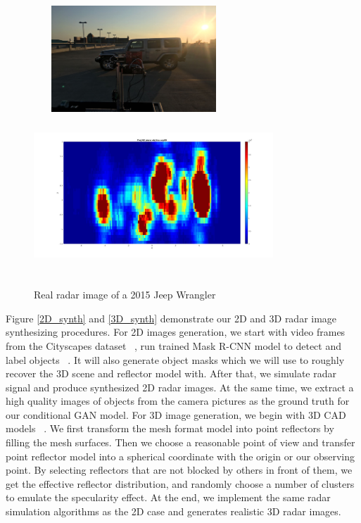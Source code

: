 \begin{figure}
	\centering
	\includegraphics[width=7.5cm,height=4cm]{./figure/exp_1.png}\\
	\includegraphics[width=9cm,height=6cm]{./figure/exp_1_img.jpg}
	\caption{Real radar image of a 2015 Jeep Wrangler}
	\label{fig_real}
\end{figure} 

Figure \ref{2D_synth} and \ref{3D_synth} demonstrate our 2D and 3D radar image synthesizing procedures. For 2D images generation, we start with video frames from the Cityscapes dataset ~\cite{cityscapes}, run trained Mask R-CNN model to detect and label objects ~\cite{rcnn}. It will also generate object masks which we will use to roughly recover the 3D scene and reflector model with. After that, we simulate radar signal and produce synthesized 2D radar images. At the same time, we extract a high quality images of objects from the camera pictures as the ground truth for our conditional GAN model.  For 3D image generation, we begin with 3D CAD models ~\cite{3Ddata}. We first transform the mesh format model into point reflectors by filling the mesh surfaces. Then we choose a reasonable point of view and transfer point reflector model into a spherical coordinate with the origin or our observing point. By selecting reflectors that are not blocked by others in front of them, we get the effective reflector distribution, and randomly choose a number of clusters to emulate the specularity effect. At the end, we implement the same radar simulation algorithms as the 2D case and generates realistic 3D radar images. 

